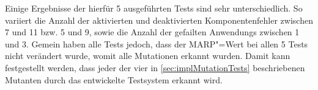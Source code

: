 Einige Ergebnisse der hierfür 5 ausgeführten \glspl{Test} sind sehr unterschiedlich.
So variiert die Anzahl der aktivierten und deaktivierten Komponentenfehler zwischen 7 und 11 bzw. 5 und 9, sowie die Anzahl der gefailten \glspl{Anwendung} zwischen 1 und 3.
Gemein haben alle \glspl{Test} jedoch, dass der \gls{MARP}"=Wert bei allen 5 \glspl{Test} nicht verändert wurde, womit alle Mutationen erkannt wurden.
Damit kann festgestellt werden, dass jeder der vier in \cref{sec:implMutationTests} beschriebenen Mutanten durch das entwickelte Testsystem erkannt wird.
